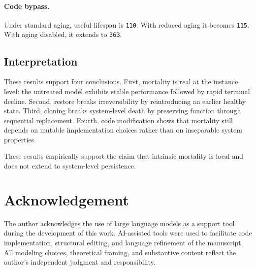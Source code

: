 \documentclass[11pt]{article}
\begin{document}
\paragraph{Code bypass.}
Under standard aging, useful lifespan is \texttt{110}. With reduced aging it becomes \texttt{115}. With aging disabled, it extends to \texttt{363}.

\subsection{Interpretation}

These results support four conclusions. First, mortality is real at the instance level: the untreated model exhibits stable performance followed by rapid terminal decline. Second, restore breaks irreversibility by reintroducing an earlier healthy state. Third, cloning breaks system-level death by preserving function through sequential replacement. Fourth, code modification shows that mortality still depends on mutable implementation choices rather than on inseparable system properties.

These results empirically support the claim that intrinsic mortality is local and does not extend to system-level persistence.

\section*{Acknowledgement}

The author acknowledges the use of large language models as a support tool during the development of this work. AI-assisted tools were used to facilitate code implementation, structural editing, and language refinement of the manuscript. All modeling choices, theoretical framing, and substantive content reflect the author's independent judgment and responsibility.
\end{document}
